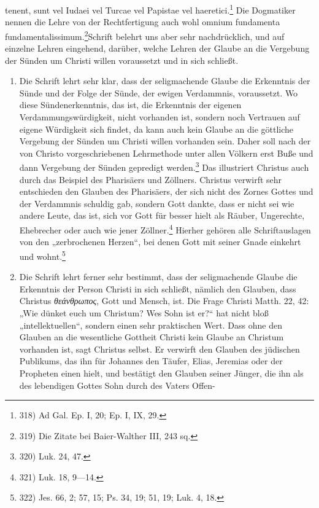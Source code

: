 \n\setcounter{page}{91}\n{}\n{} tenent, sunt vel Iudaei vel Turcae vel Papistae vel haeretici.\footnote{318) Ad Gal. Ep. I, 20; Ep. I, IX, 29.} Die Dogmatiker nennen die Lehre von der Rechtfertigung auch wohl omnium fundamenta fundamentalissimum.\footnote{319) Die Zitate bei Baier-Walther III, 243 sq.}\nDie Schrift belehrt uns aber sehr nachdrücklich, und auf einzelne Lehren eingehend, darüber, welche Lehren der Glaube an die Vergebung der Sünden um Christi willen voraussetzt und in sich schließt.\n\n\begin{enumerate}\n    \item Die Schrift lehrt sehr klar, dass der seligmachende Glaube die Erkenntnis der Sünde und der Folge der Sünde, der ewigen Verdammnis, voraussetzt. Wo diese Sündenerkenntnis, das ist, die Erkenntnis der eigenen Verdammungswürdigkeit, nicht vorhanden ist, sondern noch Vertrauen auf eigene Würdigkeit sich findet, da kann auch kein Glaube an die göttliche Vergebung der Sünden um Christi willen vorhanden sein. Daher soll nach der von Christo vorgeschriebenen Lehrmethode unter allen Völkern erst Buße und dann Vergebung der Sünden gepredigt werden.\footnote{320) Luk. 24, 47.} Das illustriert Christus auch durch das Beispiel des Pharisäers und Zöllners. Christus verwirft sehr entschieden den Glauben des Pharisäers, der sich nicht des Zornes Gottes und der Verdammnis schuldig gab, sondern Gott dankte, dass er nicht sei wie andere Leute, das ist, sich vor Gott für besser hielt als Räuber, Ungerechte, Ehebrecher oder auch wie jener Zöllner.\footnote{321) Luk. 18, 9—14.} Hierher gehören alle Schriftauslagen von den „zerbrochenen Herzen“, bei denen Gott mit seiner Gnade einkehrt und wohnt.\footnote{322) Jes. 66, 2; 57, 15; Ps. 34, 19; 51, 19; Luk. 4, 18.}\n    \item Die Schrift lehrt ferner sehr bestimmt, dass der seligmachende Glaube die Erkenntnis der Person Christi in sich schließt, nämlich den Glauben, dass Christus \textit{θεάνθρωπος}, Gott und Mensch, ist. Die Frage Christi Matth. 22, 42: „Wie dünket euch um Christum? Wes Sohn ist er?“ hat nicht bloß „intellektuellen“, sondern einen sehr praktischen Wert. Dass ohne den Glauben an die wesentliche Gottheit Christi kein Glaube an Christum vorhanden ist, sagt Christus selbst. Er verwirft den Glauben des jüdischen Publikums, das ihn für Johannes den Täufer, Elias, Jeremias oder der Propheten einen hielt, und bestätigt den Glauben seiner Jünger, die ihn als des lebendigen Gottes Sohn durch des Vaters Offen-\n\end{enumerate}
